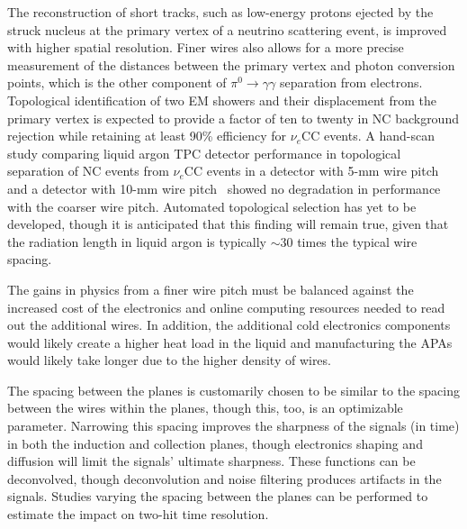 The reconstruction of short tracks, such as low-energy protons ejected
by the struck nucleus at the primary vertex of a neutrino scattering
event, is improved with higher spatial resolution.  Finer wires also
allows for a more precise measurement of the distances between the
primary vertex and photon conversion points, which is the other
component of $\pi^0\rightarrow\gamma\gamma$ separation from electrons.
Topological identification of two EM showers and their displacement
from the primary vertex is expected to provide a factor of ten to
twenty in NC background rejection while retaining at least 90\%
efficiency for $\nu_e$CC events.  A hand-scan study comparing liquid
argon TPC detector performance in topological separation of NC events
from $\nu_e$CC events in a detector with 5-mm wire pitch and a
detector with 10-mm wire pitch~\cite{2008-hand-scan} showed no
degradation in performance with the coarser %
wire pitch.  Automated
topological selection has yet to be developed, though it is
anticipated that this finding will remain true, %
given that the radiation length in liquid argon is typically
$\sim$30 times the typical wire spacing.

The gains in physics from a finer wire pitch must be balanced against the increased cost of the
electronics and online computing resources needed to read out the
additional wires. %
In addition, the additional cold electronics
components would likely create a higher heat load in
the liquid and %
manufacturing the APAs would likely %
take longer %
due to the higher density of wires. %

The spacing between the planes is customarily chosen to be similar to
the spacing between the wires within the planes, though this, too, is an
optimizable parameter.  Narrowing this spacing improves the sharpness
of the signals (in time) in both the induction and collection planes,
though electronics shaping and diffusion will limit the signals' ultimate sharpness. %
These functions can be deconvolved,
though deconvolution and noise filtering produces artifacts in the
signals.  Studies varying the spacing between the planes can be
performed to estimate the impact on two-hit time resolution. %



